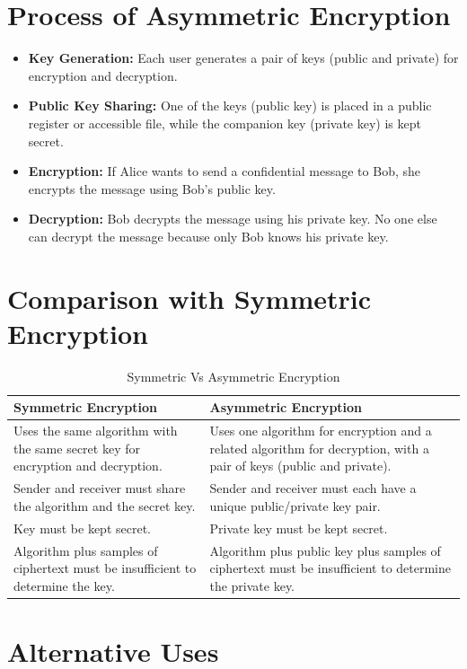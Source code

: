 \section{Process of Asymmetric Encryption}

\begin{itemize}
    \item \textbf{Key Generation:} Each user generates a pair of keys (public and private) for encryption and decryption.
    \item \textbf{Public Key Sharing:} One of the keys (public key) is placed in a public register or accessible file, while the companion key (private key) is kept secret.
    \item \textbf{Encryption:} If Alice wants to send a confidential message to Bob, she encrypts the message using Bob’s public key.
    \item \textbf{Decryption:} Bob decrypts the message using his private key. No one else can decrypt the message because only Bob knows his private key.
\end{itemize}

\section{Comparison with Symmetric Encryption}
\begin{table}[h!]
    \centering
\begin{tabular}{|p{6.5cm}|p{6.5cm}|}
\hline
\textbf{Symmetric Encryption} & \textbf{Asymmetric Encryption} \\
\hline
Uses the same algorithm with the same secret key for encryption and decryption. & Uses one algorithm for encryption and a related algorithm for decryption, with a pair of keys (public and private). \\
\hline
Sender and receiver must share the algorithm and the secret key. & Sender and receiver must each have a unique public/private key pair. \\
\hline
Key must be kept secret. & Private key must be kept secret. \\
\hline
Algorithm plus samples of ciphertext must be insufficient to determine the key. & Algorithm plus public key plus samples of ciphertext must be insufficient to determine the private key. \\
\hline
\end{tabular}
\caption{Symmetric Vs Asymmetric Encryption}
\end{table}
\section{Alternative Uses}

